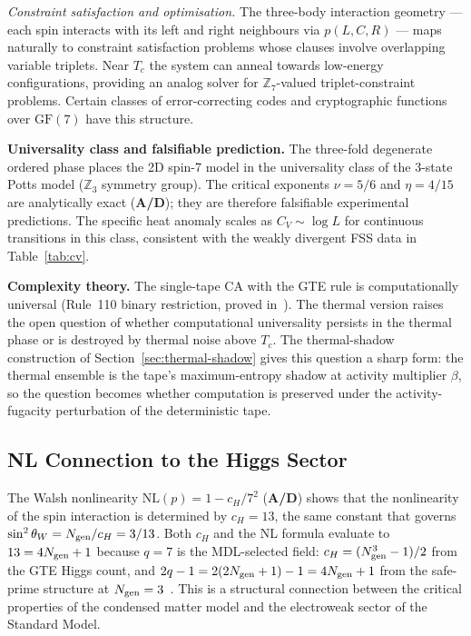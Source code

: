 \documentclass[11pt]{article}
\theoremstyle{remark}
\newcommand{\GF}[1]{\ensuremath{\mathrm{GF}(#1)}}
\newcommand{\CatAD}{\textbf{A/D}}
\begin{document}
\noindent\emph{Constraint satisfaction and optimisation.}
The three-body interaction geometry --- each spin interacts with its left and right
neighbours via $p(L,C,R)$ --- maps naturally to constraint satisfaction problems
whose clauses involve overlapping variable triplets. Near $T_c$ the system can
anneal towards low-energy configurations, providing an analog solver for
$\mathbb{Z}_7$-valued triplet-constraint problems. Certain classes of error-correcting
codes and cryptographic functions over $\GF{7}$ have this structure.

\medskip
\noindent\textbf{Universality class and falsifiable prediction.}
The three-fold degenerate ordered phase places the 2D spin-7 model in the universality
class of the 3-state Potts model ($\mathbb{Z}_3$ symmetry group). The critical exponents
$\nu = 5/6$ and $\eta = 4/15$ are analytically exact (\CatAD{}); they are therefore
falsifiable experimental predictions. The specific heat anomaly scales as
$C_V \sim \log L$ for continuous transitions in this class, consistent with the
weakly divergent FSS data in Table~\ref{tab:cv}.

\medskip
\noindent\textbf{Complexity theory.}
The single-tape CA with the GTE rule is computationally universal (Rule~110 binary
restriction, proved in~\cite{Cook2004, SpivackCompUniversality}). The thermal version
raises the open question of whether computational universality persists in the thermal
phase or is destroyed by thermal noise above $T_c$. The thermal-shadow
construction of Section~\ref{sec:thermal-shadow} gives this question a sharp
form: the thermal ensemble is the tape's maximum-entropy shadow at activity
multiplier $\beta$, so the question becomes whether computation is preserved
under the activity-fugacity perturbation of the deterministic tape.

\subsection{NL Connection to the Higgs Sector}

The Walsh nonlinearity $\mathrm{NL}(p) = 1 - c_H/7^2$ (\CatAD{}) shows that
the nonlinearity of the spin interaction is determined by $c_H = 13$, the same
constant that governs $\sin^2\theta_W = N_{\rm gen}/c_H = 3/13$. Both $c_H$ and
the NL formula evaluate to $13 = 4N_{\rm gen}+1$ because $q = 7$ is the
MDL-selected field: $c_H = (N_{\rm gen}^3-1)/2$ from the GTE Higgs
count, and $2q-1 = 2(2N_{\rm gen}+1)-1 = 4N_{\rm gen}+1$ from the safe-prime
structure at $N_{\rm gen} = 3$~\cite{SpivackGTEPolynomialWolfram}. This is a
structural connection between the critical properties of the condensed matter model
and the electroweak sector of the Standard Model.
\end{document}

